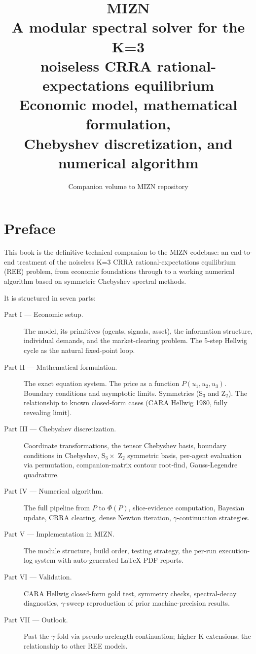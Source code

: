 \documentclass[11pt,oneside]{book}
\title{\Huge\textbf{MIZN}\\
\Large A modular spectral solver for the K=3\\
noiseless CRRA rational-expectations equilibrium\\[1em]
\large Economic model, mathematical formulation,\\
Chebyshev discretization, and numerical algorithm}
\author{Companion volume to MIZN repository}
\date{}
\theoremstyle{definition}
\begin{document}
\frontmatter
\maketitle
\tableofcontents
\listoffigures

\chapter*{Preface}

This book is the definitive technical companion to the MIZN codebase: an end-to-end
treatment of the noiseless K=3 CRRA rational-expectations equilibrium (REE) problem,
from economic foundations through to a working numerical algorithm based on
symmetric Chebyshev spectral methods.

It is structured in seven parts:

\begin{description}
\item[Part I --- Economic setup.] The model, its primitives (agents, signals,
asset), the information structure, individual demands, and the market-clearing
problem. The 5-step Hellwig cycle as the natural fixed-point loop.

\item[Part II --- Mathematical formulation.] The exact equation system. The
price as a function $P(u_1,u_2,u_3)$. Boundary conditions and asymptotic limits.
Symmetries (S$_3$ and Z$_2$). The relationship to known closed-form cases
(CARA Hellwig 1980, fully revealing limit).

\item[Part III --- Chebyshev discretization.] Coordinate transformations, the
tensor Chebyshev basis, boundary conditions in Chebyshev, S$_3 \times$ Z$_2$
symmetric basis, per-agent evaluation via permutation, companion-matrix
contour root-find, Gauss-Legendre quadrature.

\item[Part IV --- Numerical algorithm.] The full pipeline from $P$ to $\Phi(P)$,
slice-evidence computation, Bayesian update, CRRA clearing, dense Newton
iteration, $\gamma$-continuation strategies.

\item[Part V --- Implementation in MIZN.] The module structure, build order,
testing strategy, the per-run execution-log system with auto-generated LaTeX
PDF reports.

\item[Part VI --- Validation.] CARA Hellwig closed-form gold test, symmetry
checks, spectral-decay diagnostics, $\gamma$-sweep reproduction of prior
machine-precision results.

\item[Part VII --- Outlook.] Past the $\gamma$-fold via pseudo-arclength
continuation; higher K extensions; the relationship to other REE models.
\end{description}
\end{document}
